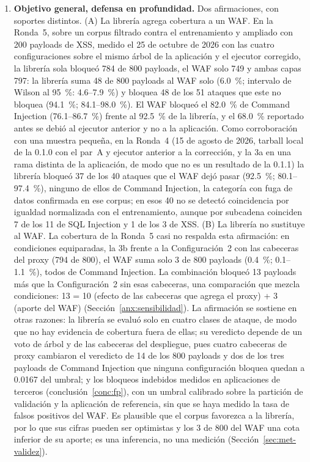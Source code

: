 \begin{enumerate}
    \item \textbf{Objetivo general, defensa en profundidad.}\label{conc:waf} Dos afirmaciones, con soportes
    distintos. (A) La librería agrega cobertura a un WAF. En la Ronda~5, sobre un corpus filtrado
    contra el entrenamiento y ampliado con 200 payloads de XSS, medido el 25 de octubre de 2026 con
    las cuatro configuraciones sobre el mismo árbol de la aplicación y el ejecutor corregido, la
    librería sola bloqueó 784 de 800 payloads, el WAF solo 749 y ambas capas 797: la librería suma
    48 de 800 payloads al WAF solo (6.0~\%; intervalo de Wilson al 95~\%: 4.6--7.9~\%) y bloquea 48
    de los 51 ataques que este no bloquea (94.1~\%; 84.1--98.0~\%). El WAF bloqueó el 82.0~\% de
    Command Injection (76.1--86.7~\%) frente al 92.5~\% de la librería, y el 68.0~\% reportado antes
    se debió al ejecutor anterior y no a la aplicación. Como corroboración con una muestra pequeña,
    en la Ronda~4 (15 de agosto de 2026, tarball local de la 0.1.0 con el par~A y ejecutor anterior a
    la corrección, y la 3a en una rama distinta de la aplicación, de modo que no es un resultado de
    la 0.1.1) la librería bloqueó 37 de los 40
    ataques que el WAF dejó pasar (92.5~\%; 80.1--97.4~\%), ninguno de ellos de Command Injection,
    la categoría con fuga de datos confirmada en ese corpus; en esos 40 no se detectó coincidencia
    por igualdad normalizada con el entrenamiento, aunque por subcadena coinciden 7 de los 11 de SQL
    Injection y 1 de los 3 de XSS. (B) La librería no sustituye al WAF. La cobertura de la Ronda~5
    casi no respalda esta afirmación: en condiciones equiparadas, la 3b frente a la Configuración~2
    con las cabeceras del proxy (794 de 800), el WAF suma solo 3 de 800 payloads (0.4~\%; 0.1--1.1~\%),
    todos de Command Injection. La combinación bloqueó 13 payloads más que la Configuración~2 sin
    esas cabeceras, una comparación que mezcla condiciones: 13 = 10 (efecto de las cabeceras que
    agrega el proxy) + 3 (aporte del WAF) (Sección~\ref{anx:sensibilidad}). La afirmación se sostiene
    en otras razones: la librería se evaluó solo en cuatro clases de ataque, de modo que no hay
    evidencia de cobertura fuera de ellas; su veredicto depende de un voto de árbol y de las
    cabeceras del despliegue, pues cuatro cabeceras de proxy cambiaron el veredicto de 14 de los 800
    payloads y dos de los tres payloads de Command Injection que ninguna configuración bloquea quedan
    a 0.0167 del umbral; y los bloqueos indebidos medidos en aplicaciones de terceros
    (conclusión~\ref{conc:fp}), con un umbral calibrado sobre la partición de validación y la
    aplicación de referencia, sin que se haya medido la tasa de falsos positivos del WAF. Es
    plausible que el corpus favorezca a la librería, por lo que sus cifras pueden ser optimistas y
    los 3 de 800 del WAF una cota inferior de su aporte; es una inferencia, no una medición
    (Sección~\ref{sec:met-validez}).


\end{enumerate}
